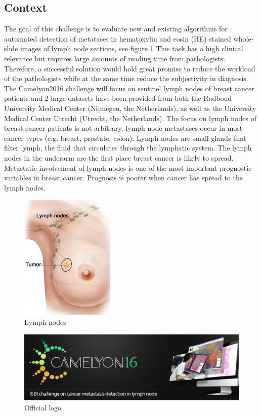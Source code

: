 \documentclass{article}
\begin{document}
\subsection{Context}
The goal of this challenge is to evaluate new and existing algorithms for automated detection of metatases in hematoxylin and eosin (HE) stained whole-slide images of lymph node sections, see figure \ref{LymphNode} This task has a high clinical relevance but requires large amounts of reading time from pathologists. Therefore, a successful solution would hold great promise to reduce the workload of the pathologists while at the same time reduce the subjectivity in diagnosis. The Camelyon2016 challenge will focus on sentinel lymph nodes of breast cancer patients and 2 large datasets have been provided from both the Radboud University Medical Center (Nijmegen, the Netherlands), as well as the University Medical Center Utrecht (Utrecht, the Netherlands). The focus on lymph nodes of breast cancer patients is not arbitrary, lymph node metastases occur in most cancer types (e.g. breast, prostate, colon). Lymph nodes are small glands that filter lymph, the fluid that circulates through the lymphatic system. The lymph nodes in the underarm are the first place breast cancer is likely to spread. Metastatic involvement of lymph nodes is one of the most important prognostic variables in breast cancer. Prognosis is poorer when cancer has spread to the lymph nodes.


\begin{figure}[!ht]
\centering
\includegraphics[width=0.4\textwidth]{Booby.png}
\caption{Lymph nodes}
\label{LymphNode}
\end{figure}

\begin{figure}[!ht]
\centering
\includegraphics[width=\textwidth]{Camelyon16.png}
\caption{Official logo}
\label{Ol}
\end{figure}
\end{document}
